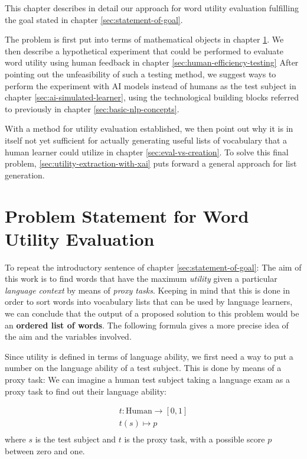 This chapter describes in detail our approach for word utility evaluation fulfilling the goal stated in chapter \ref{sec:statement-of-goal}.

The problem is first put into terms of mathematical objects in chapter \ref{sec:problem-statement-formal}.
We then describe a hypothetical experiment that could be performed to evaluate word utility using human feedback in chapter \ref{sec:human-efficiency-testing}
After pointing out the unfeasibility of such a testing method, we suggest ways to perform the experiment with AI models instead of humans as the test subject in chapter \ref{sec:ai-simulated-learner}, using the technological building blocks referred to previously in chapter \ref{sec:basic-nlp-concepts}.

With a method for utility evaluation established, we then point out why it is in itself not yet sufficient for actually generating useful lists of vocabulary that a human learner could utilize in chapter \ref{sec:eval-vs-creation}.
To solve this final problem, \ref{sec:utility-extraction-with-xai} puts forward a general approach for list generation.

\section{Problem Statement for Word Utility Evaluation} \label{sec:problem-statement-formal}


To repeat the introductory sentence of chapter \ref{sec:statement-of-goal}:
The aim of this work is to find words that have the maximum \textit{utility} given a particular \textit{language context} by means of \textit{proxy tasks}.
Keeping in mind that this is done in order to sort words into vocabulary lists that can be used by language learners, we can conclude that the output of a proposed solution to this problem would be an \textbf{ordered list of words}. The following formula gives a more precise idea of the aim and the variables involved.

Since utility is defined in terms of language ability, we first need a way to put a number on the language ability of a test subject. This is done by means of a proxy task: We can imagine a human test subject taking a language exam as a proxy task to find out their language ability:

\begin{align*}
	t: \text{Human} \to [0, 1] \\
	t (s) \mapsto p            \\
\end{align*}
where $s$ is the test subject and $t$ is the proxy task, with a possible score $p$ between zero and one.

